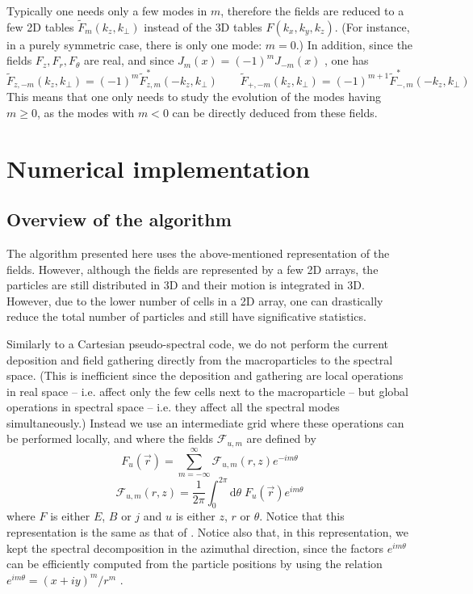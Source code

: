 \documentclass[a4paper]{article}   	%
\newcommand{\TInteg}[1]{\int_{0}^{2\pi} \!\!\!\!\! \mathrm{d}#1}
\begin{document}
Typically one needs only a few modes in $m$, therefore the fields are
reduced to a few 2D tables $\tilde{F}_m(k_z,k_\perp )$ instead of the
3D tables $\hat{F}(k_x,k_y,k_z)$. (For instance, in a purely symmetric
case, there is only one mode: $m=0$.) In addition, since the fields
$F_z, F_r, F_\theta$ are real, and since $J_m(x) =(-1)^mJ_{-m}(x)$ \cite{Abramowitz},
one has
\[ \tilde{F}_{z,-m}(k_z, k_\perp) = (-1)^m\tilde{F}_{z,m}^{*} (-k_z,
k_\perp) \qquad \tilde{F}_{+,-m}(k_z, k_\perp) =
(-1)^{m+1} \tilde{F}_{-,m}^{*} (-k_z, k_\perp) \]
This means that one only needs to study the evolution of the modes having $m\geq 0$, as the modes with $m<0$ can
be directly deduced from these fields.

\section{Numerical implementation}

\subsection{Overview of the algorithm}

The algorithm presented here uses the above-mentioned representation
of the fields. However, although the fields are represented by a few
2D arrays, the particles are still distributed in 3D and their motion
is integrated in 3D. However, due to the
lower number of cells in a 2D array, one can drastically reduce the
total number of particles and still have significative statistics.

Similarly to a Cartesian pseudo-spectral code, we do not perform the
current deposition and field gathering directly from the
macroparticles to the spectral space. (This is inefficient since the
deposition and gathering are local operations in real space -- i.e. affect
only the few cells next to the macroparticle -- but global operations
in spectral space -- i.e. they affect all the spectral modes
simultaneously.) Instead we use an intermediate grid where these
operations can be performed locally, and where the fields $\mathcal{F}_{u,m}$
are defined by
\begin{equation} 
\label{eq:IntermBwTrans}
F_u(\vec{r}) = \sum_{m=-\infty}^{\infty} \mathcal{F}_{u,m}(r,z)
e^{-im\theta} 
\end{equation}
\begin{equation}
\label{eq:IntermFwTrans}
\mathcal{F}_{u,m}(r,z) = \frac{1}{2\pi} \TInteg{\theta} \;
F_u(\vec{r})e^{im\theta}
\end{equation}
where ${F}$ is either ${E}$, ${B}$ or
${j}$ and $u$ is either $z$, $r$ or $\theta$. Notice that this representation is the
same as that of \cite{Lifschitz, Davidson}. Notice also that, in this
representation, we kept the spectral decomposition in the azimuthal
direction, since the factors $e^{im\theta}$ can be efficiently computed from the
particle positions by using the relation $e^{im\theta} = (x+iy)^m/r^m$
\cite{Lifschitz}.
\end{document}
